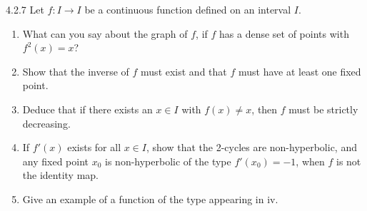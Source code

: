 \begin{problem}{4.2.7}
  Let $f: I \to I$ be a continuous function defined on an interval $I$.

  \begin{enumerate}
    \item What can you say about the graph of $f$, if $f$ has a dense set of
      points with $f^2(x) = x$?
    \item Show that the inverse of $f$ must exist and that $f$ must have at least
      one fixed point.
    \item Deduce that if there exists an $x \in I$ with $f(x) \neq x$, then $f$ must be strictly decreasing.
    \item If $f'(x)$ exists for all $x \in I$, show that the 2-cycles are non-hyperbolic,
      and any fixed point $x_0$ is non-hyperbolic of the type $f'(x_0)=-1$, when $f$ is not the identity map.
    \item Give an example of a function of the type appearing in iv.
  \end{enumerate}
\end{problem}

